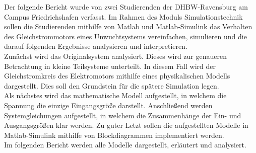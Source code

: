 \label{kurzfassung}

Der folgende Bericht wurde von zwei Studierenden der \ac{DHBW}-Ravensburg am Campus Friedrichshafen verfasst. Im Rahmen des Moduls Simulationstechnik sollen die Studierenden mithilfe von Matlab und Matlab-Simulink das Verhalten des Gleichstrommotors eines Unwuchtsystems vereinfachen, simulieren und die darauf folgenden Ergebnisse analysieren und interpretieren. \\
Zunächst wird das Originalsystem analysiert. Dieses wird zur genaueren Betrachtung in kleine Teilsysteme unterteilt. In diesem Fall wird der Gleichstromkreis des Elektromotors mithilfe eines physikalischen Modells dargestellt. Dies soll den Grundstein für die spätere Simulation legen. \\
Als nächstes wird das mathematische Modell aufgestellt, in welchem die Spannung die einzige Eingangsgröße darstellt. Anschließend werden Systemgleichungen aufgestellt, in welchem die Zusammenhänge der Ein- und Ausgangsgrößen klar werden. Zu guter Letzt sollen die aufgestellten Modelle in Matlab-Simulink mithilfe von Blockdiagrammen implementiert werden. \\
Im folgenden Bericht werden alle Modelle dargestellt, erläutert und analysiert.